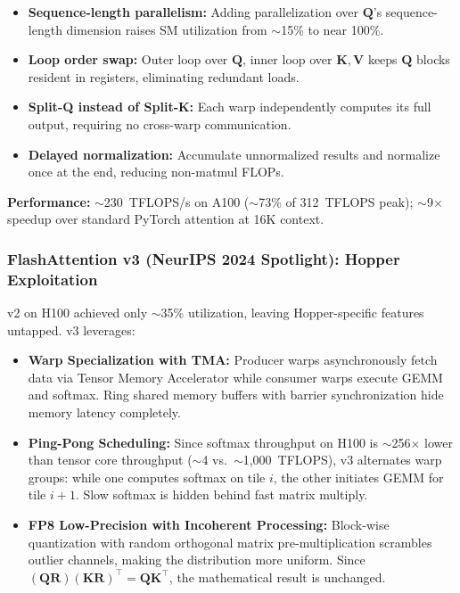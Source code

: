 \documentclass[11pt,a4paper]{article}
\begin{document}
\begin{itemize}[leftmargin=*]
    \item \textbf{Sequence-length parallelism:} Adding parallelization over $\mathbf{Q}$'s sequence-length dimension raises SM utilization from $\sim$15\% to near 100\%.
    \item \textbf{Loop order swap:} Outer loop over $\mathbf{Q}$, inner loop over $\mathbf{K},\mathbf{V}$ keeps $\mathbf{Q}$ blocks resident in registers, eliminating redundant loads.
    \item \textbf{Split-Q instead of Split-K:} Each warp independently computes its full output, requiring no cross-warp communication.
    \item \textbf{Delayed normalization:} Accumulate unnormalized results and normalize once at the end, reducing non-matmul FLOPs.
\end{itemize}

\textbf{Performance:} $\sim$230~TFLOPS/s on A100 ($\sim$73\% of 312~TFLOPS peak); $\sim$9$\times$ speedup over standard PyTorch attention at 16K context.

\subsubsection{FlashAttention v3 (NeurIPS 2024 Spotlight): Hopper Exploitation}

v2 on H100 achieved only $\sim$35\% utilization, leaving Hopper-specific features untapped. v3 leverages:

\begin{itemize}[leftmargin=*]
    \item \textbf{Warp Specialization with TMA:} Producer warps asynchronously fetch data via Tensor Memory Accelerator while consumer warps execute GEMM and softmax. Ring shared memory buffers with barrier synchronization hide memory latency completely.
    \item \textbf{Ping-Pong Scheduling:} Since softmax throughput on H100 is $\sim$256$\times$ lower than tensor core throughput ($\sim$4 vs.\ $\sim$1,000~TFLOPS), v3 alternates warp groups: while one computes softmax on tile $i$, the other initiates GEMM for tile $i+1$. Slow softmax is hidden behind fast matrix multiply.
    \item \textbf{FP8 Low-Precision with Incoherent Processing:} Block-wise quantization with random orthogonal matrix pre-multiplication scrambles outlier channels, making the distribution more uniform. Since $(\mathbf{Q}\mathbf{R})(\mathbf{K}\mathbf{R})^\top = \mathbf{Q}\mathbf{K}^\top$, the mathematical result is unchanged.
\end{itemize}
\end{document}
